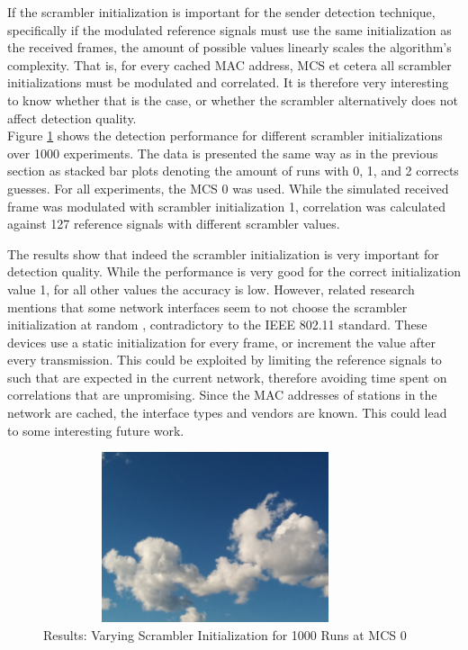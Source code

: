 If the scrambler initialization is important for the sender detection technique, specifically if the modulated reference signals must use the same initialization as the received frames, the amount of possible values linearly scales the algorithm's complexity. That is, for every cached \gls{MAC} address, \gls{MCS} et cetera all scrambler initializations must be modulated and correlated. It is therefore very interesting to know whether that is the case, or whether the scrambler alternatively does not affect detection quality.\\

Figure \ref{fig:vary_scrambler} shows the detection performance for different scrambler initializations over 1000 experiments. The data is presented the same way as in the previous section as stacked bar plots denoting the amount of runs with 0, 1, and 2 corrects guesses. For all experiments, the \gls{MCS} 0 was used. While the simulated received frame was modulated with scrambler initialization 1, correlation was calculated against 127 reference signals with different scrambler values.

The results show that indeed the scrambler initialization is very important for detection quality. While the performance is very good for the correct initialization value 1, for all other values the accuracy is low. However, related research mentions that some network interfaces seem to not choose the scrambler initialization at random \cite{noubir2016}, contradictory to the IEEE 802.11 standard. These devices use a static initialization for every frame, or increment the value after every transmission. This could be exploited by limiting the reference signals to such that are expected in the current network, therefore avoiding time spent on correlations that are unpromising. Since the \gls{MAC} addresses of stations in the network are cached, the interface types and vendors are known. This could lead to some interesting future work.

\begin{figure}[H]
	\centering
	\includegraphics[width=0.9\textwidth,height=5cm]{gfx/images/stock-clouds}
	\caption[Results: Varying Scrambler Initialization for 1000 Experiments]{Results: Varying Scrambler Initialization for 1000 Runs at MCS 0}
	\label{fig:vary_scrambler}
\end{figure}


